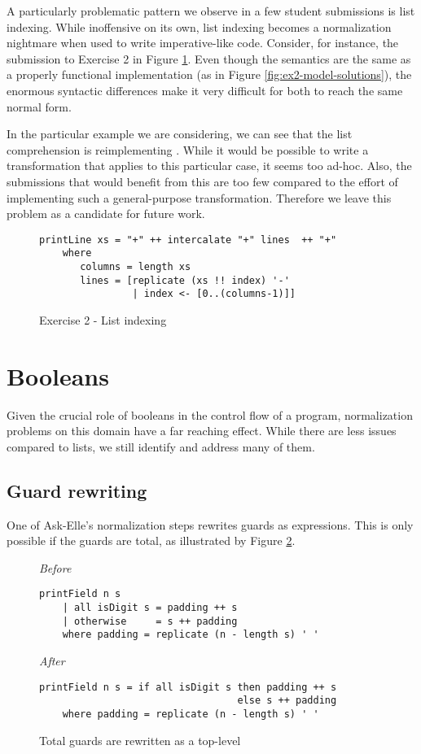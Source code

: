 A particularly problematic pattern we observe in a few student submissions is list indexing. While inoffensive on its own, list indexing becomes a normalization nightmare when used to write imperative-like code. Consider, for instance, the submission to Exercise 2 in Figure \ref{fig:ex2-list-indexing}. Even though the semantics are the same as a properly functional implementation (as in Figure \ref{fig:ex2-model-solutions}), the enormous syntactic differences make it very difficult for both to reach the same normal form.

In the particular example we are considering, we can see that the list comprehension is reimplementing . While it would be possible to write a transformation that applies to this particular case, it seems too ad-hoc. Also, the submissions that would benefit from this are too few compared to the effort of implementing such a general-purpose transformation. Therefore we leave this problem as a candidate for future work.


\begin{figure}
\centering
\begin{verbatim}
printLine xs = "+" ++ intercalate "+" lines  ++ "+"
    where
       columns = length xs
       lines = [replicate (xs !! index) '-'
                | index <- [0..(columns-1)]]
\end{verbatim}
\caption{Exercise 2 - List indexing}
\label{fig:ex2-list-indexing}
\end{figure}

\section{Booleans}

Given the crucial role of booleans in the control flow of a program, normalization problems on this domain have a far reaching effect. While there are less issues compared to lists, we still identify and address many of them.

\subsection{Guard rewriting}

One of Ask-Elle's normalization steps rewrites guards as  expressions. This is only possible if the guards are total, as illustrated by Figure \ref{fig:ex3-total-guards}.

\begin{figure}
\centering
\emph{Before}
\begin{verbatim}
printField n s
    | all isDigit s = padding ++ s
    | otherwise     = s ++ padding
    where padding = replicate (n - length s) ' '
\end{verbatim}
\smallskip
\emph{After}
\begin{verbatim}
printField n s = if all isDigit s then padding ++ s
                                  else s ++ padding
    where padding = replicate (n - length s) ' '
\end{verbatim}
\caption{Total guards are rewritten as a top-level }
\label{fig:ex3-total-guards}
\end{figure}

